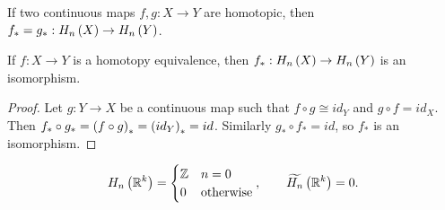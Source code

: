 \begin{theorem}
\label{thm:2.10}
If two continuous maps $ f, g : X \to Y $ are homotopic, then $ f_* = g_* : H_n\left( X \right) \to H_n\left( Y \right) $.
\end{theorem}

\begin{corollary}
If $ f : X \to Y $ is a homotopy equivalence, then $ f_* : H_n\left( X \right) \to H_n\left( Y \right) $ is an isomorphism.
\end{corollary}

\begin{proof}
Let $ g : Y \to X $ be a continuous map such that $ f \circ g \cong id_Y $ and $ g \circ f = id_X $. Then $ f_* \circ g_* = \left( f \circ g \right)_* = \left( id_Y \right)_* = id $. Similarly $ g_* \circ f_* = id $, so $ f_* $ is an isomorphism.
\end{proof}

\begin{example*}
$$ H_n\left( \mathbb{R}^k \right) =
\begin{cases}
\mathbb{Z} & n = 0 \\
0 & \text{otherwise}
\end{cases},
\qquad \widetilde{H_n}\left( \mathbb{R}^k \right) = 0.
$$
\end{example*}

\pagebreak

